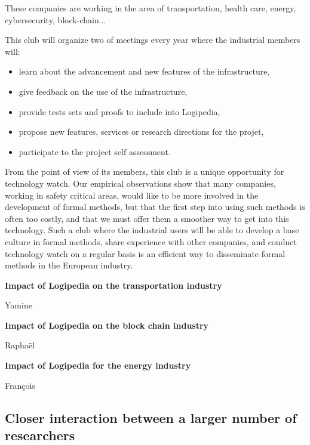 These companies are working in the area of transportation, health
care, energy, cybersecurity, block-chain...

This club will organize two of meetings every year where the
industrial members will:
\begin{itemize}
\item learn about the advancement and new features of the infrastructure,
\item give feedback on the use of the infrastructure,
\item provide tests sets and proofs to include into Logipedia,
\item propose new features, services or research directions for the projet,
\item participate to the project self assessment.
\end{itemize}
From the point of view of its members, this club is a unique
opportunity for technology watch. Our empirical observations show that
many companies, working in safety critical areas, would like to be
more involved in the development of formal methods, but that the first
step into using such methods is often too costly, and that we must
offer them a smoother way to get into this technology. Such a club
where the industrial users will be able to develop a base culture in
formal methods, share experience with other companies, and conduct
technology watch on a regular basis is an efficient way to disseminate
formal methods in the European industry.

\begin{framed}
{\bf \Large Impact of Logipedia on the transportation industry}

{\color{red} Yamine}  
\end{framed}

\begin{framed}
{\bf \Large Impact of Logipedia on the block chain industry}

{\color{red} Raphaël}  
\end{framed}

\begin{framed}
{\bf \Large Impact of Logipedia for the energy industry}

{\color{red} François}  
\end{framed}

\subsection{Closer interaction between a larger number of researchers}

